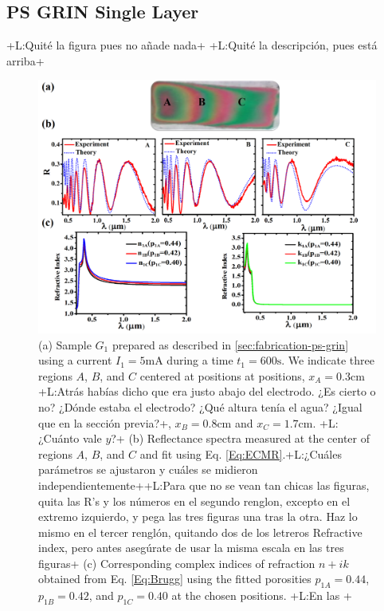 \documentclass{article}
\newcommand{\notaL}[1]{{\color{blue}+L:#1+}}
\begin{document}
\subsection{PS GRIN Single Layer }
\label{sec:ps-grin-single}
\notaL{Quité la figura pues no añade nada}
\notaL{Quité la descripción, pues está arriba}
\begin{figure}
  \centering
  \includegraphics[width=\textwidth]{Images/SPgrin51}
  \caption{(a)  Sample $G_1$ prepared as described in
     \ref{sec:fabrication-ps-grin} using a current $I_1=5 \text{mA}$
    during a time $t_1=600\text{s}$. We indicate three regions $A$,
    $B$, and $C$ centered at positions at positions,
    $x_A=0.3\text{cm}$ \notaL{Atrás habías dicho que era justo abajo
      del electrodo. ¿Es cierto o no? ¿Dónde estaba el electrodo? ¿Qué
    altura tenía el agua? ¿Igual que en la sección previa?}, $x_B=0.8\text{cm}$ and
    $x_C=1.7\text{cm}$. \notaL{¿Cuánto vale $y$?} (b) Reflectance
    spectra measured at the center of regions $A$, $B$, and $C$ and fit
    using Eq. \eqref{Eq:ECMR}.\notaL{¿Cuáles parámetros se ajustaron y
      cuáles se midieron independientemente}\notaL{Para que no se vean
      tan chicas las figuras, quita las R's y los números en el segundo
      renglon, excepto en el extremo izquierdo, y pega las tres
      figuras una tras la otra. Haz lo mismo en el tercer renglón,
      quitando dos de los letreros Refractive index, pero antes
      asegúrate de usar la misma escala en las tres figuras} (c)
    Corresponding complex indices of refraction $n+ik$ obtained from
    Eq. \eqref{Eq:Brugg} using the fitted porosities $p_{1A}=0.44$,
    $p_{1B}=0.42$, and $p_{1C}= 0.40$ at the chosen positions. \notaL{En las
}}
\end{figure}
\end{document}
